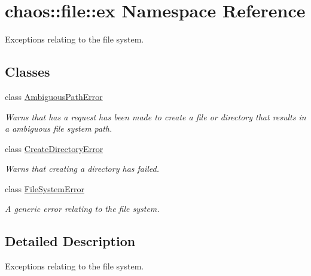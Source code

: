 \hypertarget{namespacechaos_1_1file_1_1ex}{}\section{chaos\+:\+:file\+:\+:ex Namespace Reference}
\label{namespacechaos_1_1file_1_1ex}


Exceptions relating to the file system.  


\subsection*{Classes}
\begin{DoxyCompactItemize}
\item 
class \hyperlink{classchaos_1_1file_1_1ex_1_1_ambiguous_path_error}{Ambiguous\+Path\+Error}
\begin{DoxyCompactList}\small\item\em Warns that has a request has been made to create a file or directory that results in a ambiguous file system path. \end{DoxyCompactList}\item 
class \hyperlink{classchaos_1_1file_1_1ex_1_1_create_directory_error}{Create\+Directory\+Error}
\begin{DoxyCompactList}\small\item\em Warns that creating a directory has failed. \end{DoxyCompactList}\item 
class \hyperlink{classchaos_1_1file_1_1ex_1_1_file_system_error}{File\+System\+Error}
\begin{DoxyCompactList}\small\item\em A generic error relating to the file system. \end{DoxyCompactList}\end{DoxyCompactItemize}


\subsection{Detailed Description}
Exceptions relating to the file system. 